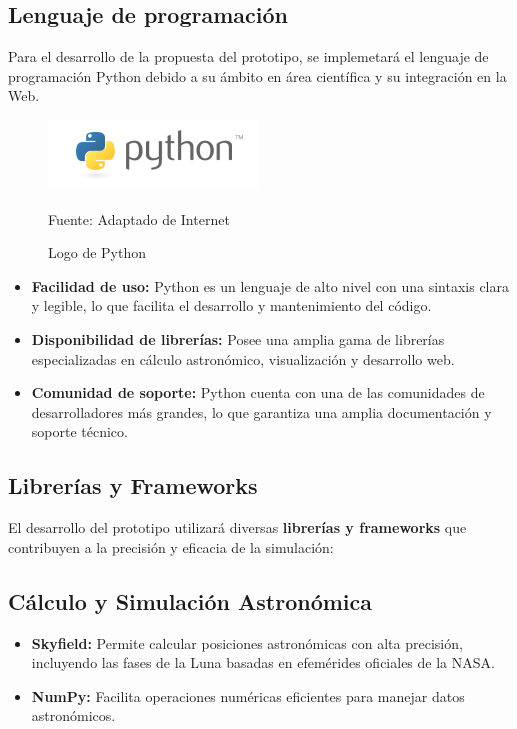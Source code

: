 \subsection{Lenguaje de programación}
Para el desarrollo de la propuesta del prototipo, se implemetará el lenguaje de programación Python debido 
a su ámbito en área científica y su integración en la Web.

\begin{figure}[H]
    \includegraphics[scale = 0.80]{Imagenes/python-logo.png}
    \centering
    \caption{Logo de Python}{Fuente: Adaptado de Internet}
\end{figure}

\begin{itemize}
    \item \textbf{Facilidad de uso:} Python es un lenguaje de alto nivel con una sintaxis clara y legible, lo que facilita el desarrollo y mantenimiento del código.
    \item \textbf{Disponibilidad de librerías:} Posee una amplia gama de librerías especializadas en cálculo astronómico, visualización y desarrollo web.
    \item \textbf{Comunidad de soporte:} Python cuenta con una de las comunidades de desarrolladores más grandes, lo que garantiza una amplia documentación y soporte técnico.
\end{itemize}

\subsection{Librerías y Frameworks}

El desarrollo del prototipo utilizará diversas \textbf{librerías y frameworks} que contribuyen a la precisión y eficacia de la simulación:

\subsection{Cálculo y Simulación Astronómica}
\begin{itemize}
    \item \textbf{Skyfield:} Permite calcular posiciones astronómicas con alta precisión, incluyendo las fases de la Luna basadas en efemérides oficiales de la NASA.
    \item \textbf{NumPy:} Facilita operaciones numéricas eficientes para manejar datos astronómicos.
\end{itemize}

